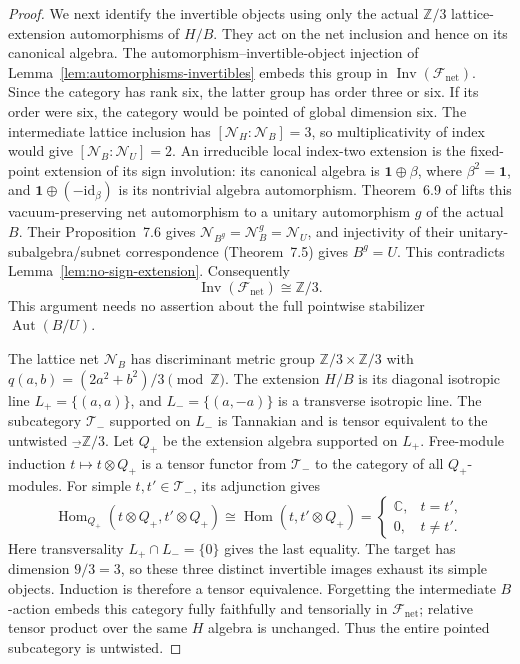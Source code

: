 \begin{proof}
We next identify the invertible objects using only the actual
$\mathbb Z/3$ lattice-extension automorphisms of $H/B$.  They act
on the net inclusion and hence on its canonical algebra.  The
automorphism--invertible-object injection of
Lemma~\ref{lem:automorphisms-invertibles} embeds this group in
$\operatorname{Inv}(\mathcal F_{\mathrm{net}})$.  Since the category
has rank six, the latter group has order three or six.  If its order
were six, the category would be pointed of global dimension six.
The intermediate lattice inclusion has $[\mathcal N_H:\mathcal N_B]=3$,
so multiplicativity of index would give
$[\mathcal N_B:\mathcal N_U]=2$.  An irreducible local index-two
extension is the fixed-point extension of its sign involution: its
canonical algebra is $\mathbf1\oplus\beta$, where $\beta^2=\mathbf1$,
and $\mathbf1\oplus(-\mathrm{id}_\beta)$ is its nontrivial algebra
automorphism.  Theorem~6.9 of \cite{CKLW} lifts this vacuum-preserving
net automorphism to a unitary automorphism $g$ of the actual $B$.
Their Proposition~7.6 gives
$\mathcal N_{B^g}=\mathcal N_B^g=\mathcal N_U$, and injectivity of
their unitary-subalgebra/subnet correspondence (Theorem~7.5) gives
$B^g=U$.  This contradicts
Lemma~\ref{lem:no-sign-extension}.  Consequently
\[
 \operatorname{Inv}(\mathcal F_{\mathrm{net}})\cong\mathbb Z/3.
\]
This argument needs no assertion about the full pointwise stabilizer
$\operatorname{Aut}(B/U)$.

The lattice net $\mathcal N_B$ has discriminant metric group
$\mathbb Z/3\times\mathbb Z/3$ with
$q(a,b)=(2a^2+b^2)/3\pmod{\mathbb Z}$.  The extension $H/B$ is its
diagonal isotropic line $L_+=\{(a,a)\}$, and
$L_-=\{(a,-a)\}$ is a transverse isotropic line.  The subcategory
$\mathcal T_-$ supported on $L_-$ is Tannakian and is tensor
equivalent to the untwisted $\Vec_{\mathbb Z/3}$.  Let $Q_+$ be the
extension algebra supported on $L_+$.  Free-module induction
$t\mapsto t\otimes Q_+$ is a tensor functor from $\mathcal T_-$ to
the category of all $Q_+$-modules.  For simple $t,t'\in\mathcal T_-$,
its adjunction gives
\[
 \operatorname{Hom}_{Q_+}(t\otimes Q_+,t'\otimes Q_+)
 \cong\operatorname{Hom}(t,t'\otimes Q_+)
 =\begin{cases}\mathbb C,&t=t',\\0,&t\ne t'.\end{cases}
\]
Here transversality $L_+\cap L_-=\{0\}$ gives the last equality.
The target has dimension $9/3=3$, so these three distinct invertible
images exhaust its simple objects.  Induction is therefore a tensor
equivalence.  Forgetting the intermediate $B$-action embeds this
category fully faithfully and tensorially in
$\mathcal F_{\mathrm{net}}$; relative tensor product over the same
$H$ algebra is unchanged.  Thus the entire pointed subcategory is
untwisted.


\end{proof}
